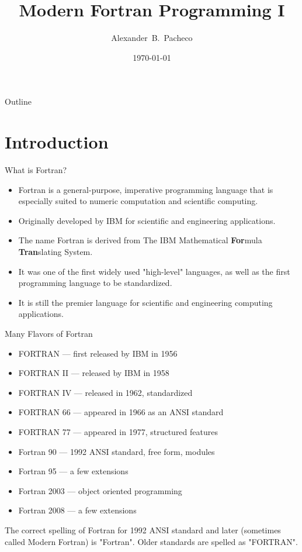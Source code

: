 \documentclass[10pt,t]{beamer}
\title{Modern Fortran Programming I}
\author[Alex Pacheco]{\large{Alexander~B.~Pacheco}}
\institute{\href{http://researchcomputing.lehigh.edu}{LTS Research Computing}}
\date{\today}
\begin{document}
\frame{\titlepage}

\begin{frame}{Outline}
  \tableofcontents
\end{frame}


\section{Introduction}
\begin{frame}{What is Fortran?}
  \begin{itemize}
    \item Fortran is a general-purpose, imperative programming language that is especially suited to numeric computation and scientific computing.
    \item Originally developed by IBM for scientific and engineering applications.
    \item The name Fortran is derived from The IBM Mathematical \textbf{For}mula \textbf{Tran}slating System.
    \item It was one of the first widely used "high-level" languages, as well as the first programming language to be standardized. 
    \item It is still the premier language for scientific and engineering computing applications.
  \end{itemize}
\end{frame}

\begin{frame}{Many Flavors of Fortran}
  \begin{itemize}
    \item FORTRAN --- first released by IBM in 1956
    \item FORTRAN II --- released by IBM in 1958
    \item FORTRAN IV --- released in 1962, standardized
    \item FORTRAN 66 --- appeared in 1966 as an ANSI standard
    \item FORTRAN 77 --- appeared in 1977, structured features
    \item Fortran 90 --- 1992 ANSI standard, free form, modules
    \item Fortran 95 --- a few extensions
    \item Fortran 2003 --- object oriented programming
    \item Fortran 2008 --- a few extensions
  \end{itemize}
  The correct spelling of Fortran for 1992 ANSI standard and later (sometimes called Modern Fortran) is "Fortran". Older standards are spelled as "FORTRAN". 
\end{frame}
\end{document}
